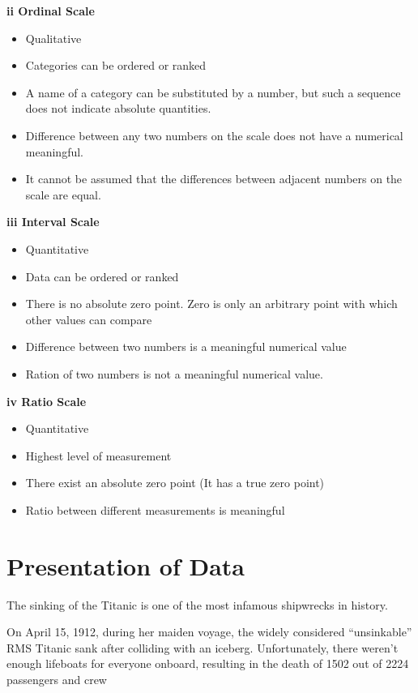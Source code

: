 \documentclass[]{book}
\providecommand{\tightlist}{%
  \setlength{\itemsep}{0pt}\setlength{\parskip}{0pt}}
\begin{document}
\textbf{ii Ordinal Scale}

\begin{itemize}
\tightlist
\item
  Qualitative
\item
  Categories can be ordered or ranked
\item
  A name of a category can be substituted by a number, but such a sequence does not indicate absolute quantities.
\item
  Difference between any two numbers on the scale does not have a numerical meaningful.
\item
  It cannot be assumed that the differences between adjacent numbers on the scale are equal.
\end{itemize}

\textbf{iii Interval Scale}

\begin{itemize}
\tightlist
\item
  Quantitative
\item
  Data can be ordered or ranked
\item
  There is no absolute zero point. Zero is only an arbitrary point with which other values can compare
\item
  Difference between two numbers is a meaningful numerical value
\item
  Ration of two numbers is not a meaningful numerical value.
\end{itemize}

\textbf{iv Ratio Scale}

\begin{itemize}
\tightlist
\item
  Quantitative
\item
  Highest level of measurement
\item
  There exist an absolute zero point (It has a true zero point)
\item
  Ratio between different measurements is meaningful
\end{itemize}

\newpage

\hypertarget{presentation-of-data}{%
\section{Presentation of Data}\label{presentation-of-data}}

The sinking of the Titanic is one of the most infamous shipwrecks in history.

On April 15, 1912, during her maiden voyage, the widely considered ``unsinkable'' RMS Titanic sank after colliding with an iceberg. Unfortunately, there weren't enough lifeboats for everyone onboard, resulting in the death of 1502 out of 2224 passengers and crew
\end{document}
